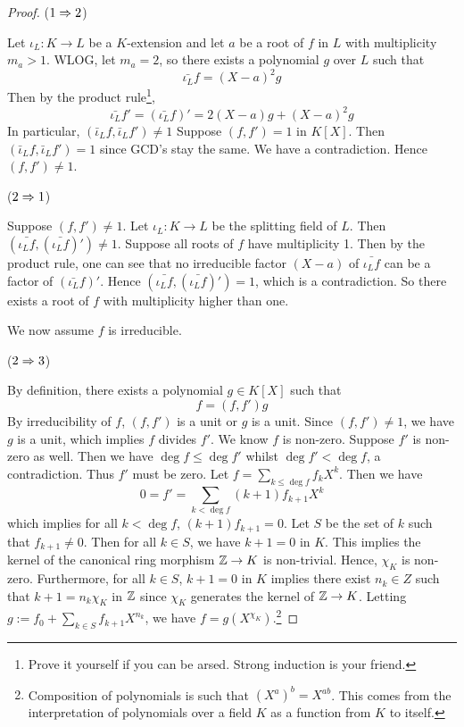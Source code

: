 \documentclass[../book.tex]{subfiles}
\begin{document}
\begin{proof}
    ($1\Rightarrow 2$)
    
        Let $\iota_L : K \to L$ be a $K$-extension 
        and let $a$ be a root of $f$ in $L$ with multiplicity $m_a > 1$. 
        WLOG, let $m_a = 2$, so there exists a polynomial $g$ over $L$ such that \[
            \bar{\iota_L} f = (X - a)^2 g
        \]
        Then by the product rule\footnote{
        Prove it yourself if you can be arsed.
        Strong induction is your friend.}, \[
            \bar{\iota_L} f' = (\bar{\iota_L} f)' = 2(X - a) g + (X - a)^2 g
        \]
        In particular, $(\bar\iota_L f, \bar\iota_L f') \neq 1$
        Suppose $(f,f') = 1$ in $K[X]$. 
        Then $(\bar\iota_L f, \bar\iota_L f') = 1$ since GCD's stay the same. 
        We have a contradiction. Hence $(f,f') \neq 1$. 
        
    ($2 \Rightarrow 1$)
        
        Suppose $(f,f') \neq 1$. 
        Let $\iota_L : K \to L$ be the splitting field of $L$. 
        Then $(\bar{\iota_L f},(\bar{\iota_L f})') \neq 1$. 
        Suppose all roots of $f$ have multiplicity 1. 
        Then by the product rule, 
        one can see that no irreducible factor $(X - a)$ of $\bar{\iota_L f}$
        can be a factor of $(\bar{\iota_L} f)'$. 
        Hence $(\bar{\iota_L f},(\bar{\iota_L f})') = 1$, which is a contradiction. 
        So there exists a root of $f$ with multiplicity higher than one. 
        
    We now assume $f$ is irreducible. 
    
    ($2\Rightarrow 3$)
    
        By definition, there exists a polynomial $g \in K[X]$ such that 
        \[f = (f,f') g\]
        By irreducibility of $f$, $(f,f')$ is a unit or $g$ is a unit. 
        Since $(f,f') \neq 1$, we have $g$ is a unit, 
        which implies $f$ divides $f'$.
        We know $f$ is non-zero. 
        Suppose $f'$ is non-zero as well.
        Then we have $\deg f \leq \deg f'$ whilst $\deg f' < \deg f$,
        a contradiction. 
        Thus $f'$ must be zero. 
        Let $f = \sum_{k\leq\deg f} f_k X^k$. 
        Then we have \[
            0 = f' = \sum_{k < \deg f} (k+1) f_{k+1} X^k
        \]
        which implies for all $k < \deg f$, $(k+1) f_{k+1} = 0$.
        Let $S$ be the set of $k$ such that $f_{k+1} \ne 0$.
        Then for all $k \in S$, we have $k+1 = 0$ in $K$.
        This implies the kernel of the canonical ring morphism 
        $\mathbb{Z} \to K$ is non-trivial. 
        Hence, $\chi_K$ is non-zero. 
        Furthermore, for all $k \in S$,
        $k+1 = 0$ in $K$ implies there exist $n_k \in Z$ such that 
        $k+1 = n_k\chi_K$ in $\mathbb{Z}$
        since $\chi_K$ generates the kernel of $\mathbb{Z} \to K$. 
        Letting $g := f_0 + \sum_{k \in S} f_{k+1}X^{n_k}$,
        we have $f = g(X^{\chi_K})$.\footnote{
            Composition of polynomials is such that $(X^a)^b=X^{ab}$.
            This comes from the interpretation of polynomials over a field $K$
            as a function from $K$ to itself. 
        }
        

\end{proof}
\end{document}
